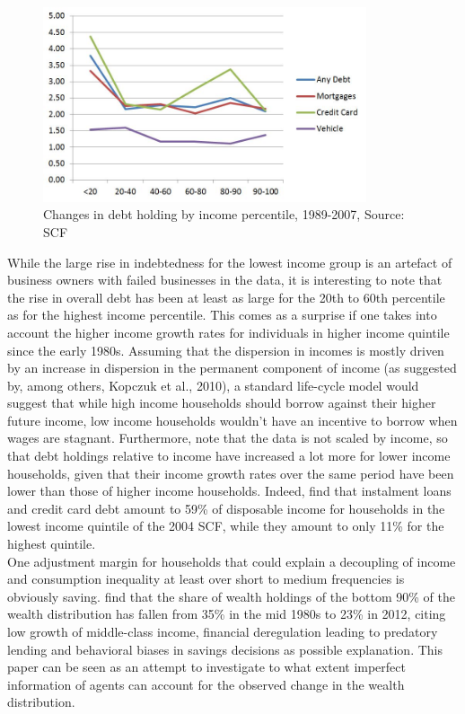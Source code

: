 \begin{figure}[ht]
	\centering
		\includegraphics[width=0.85\textwidth]{chg_debt_scf.JPG}
		\caption{Changes in debt holding by income percentile, 1989-2007, Source: SCF}
	\label{fig:chg_debt_scf}
\end{figure}
While the large rise in indebtedness for the lowest income group is an artefact of business owners with failed businesses in the data, it is interesting to note that the rise in overall debt has been at least as large for the 20th to 60th percentile as for the highest income percentile. This comes as a surprise if one takes into account the higher income growth rates for individuals in higher income quintile since the early 1980s. Assuming that the dispersion in incomes is mostly driven by an increase in dispersion in the permanent component of income (as suggested by, among others, Kopczuk et al., 2010), a standard life-cycle model would suggest that while high income households should borrow against their higher future income, low income households wouldn't have an incentive to borrow when wages are stagnant. Furthermore, note that the data is not scaled by income, so that debt holdings relative to income have increased a lot more for lower income households, given that their income growth rates over the same period have been lower than those of higher income households. Indeed, \citet{BarbaPivetti2009} find that instalment loans and credit card debt amount to 59\% of disposable income for households in the lowest income quintile of the 2004 SCF, while they amount to only 11\% for the highest quintile. \\
One adjustment margin for households that could explain a decoupling of income and consumption inequality at least over short to medium frequencies is obviously saving. \citet{SaezZucman2014} find that the share of wealth holdings of the bottom 90\% of the wealth distribution has fallen from 35\% in the mid 1980s to 23\% in 2012, citing low growth of middle-class income, financial deregulation leading to predatory lending and behavioral biases in savings decisions as possible explanation. This paper can be seen as an attempt to investigate to what extent imperfect information of agents can account for the observed change in the wealth distribution.  

